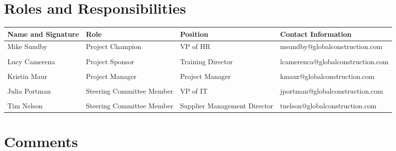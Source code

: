 \documentclass[a4paper]{article}
\begin{document}
\section{Roles and Responsibilities}
\begin{table}[H]
\centering
\scriptsize
\begin{tabular}{lp{4cm}p{4cm}p{4cm}}
\toprule
\textbf{Name and Signature} & \textbf{Role} & \textbf{Position} & \textbf{Contact Information}\\
\midrule
Mike Sundby & Project Champion & VP of HR & msundby@globalconstruction.com\\
 & & & \\
Lucy Camerena & Project Sponsor & Training Director & lcamerenca@globalconstruction.com\\
 & & & \\
Kristin Maur & Project Manager & Project Manager & kmaur@globalconstruction.com\\
 & & & \\
Julia Portman & Steering Committee Member & VP of IT & jportman@globalconstruction.com\\
 & & & \\
Tim Nelson & Steering Committee Member & Supplier Management Director & tnelson@globalconstruction.com\\
\bottomrule
\end{tabular}
\end{table}
\section{Comments}
\end{document}
